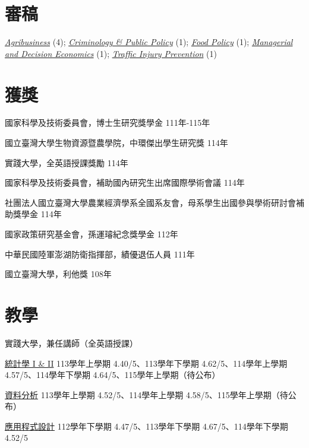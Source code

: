\documentclass[11pt,letterpaper]{article}
\begin{document}
\section{審稿}\label{ux5be9ux7a3f}

\href{https://onlinelibrary.wiley.com/journal/15206297}{\emph{Agribusiness}}
(4);
\href{https://onlinelibrary.wiley.com/journal/17459133}{\emph{Criminology
\& Public Policy}} (1);
\href{https://www.sciencedirect.com/journal/food-policy}{\emph{Food
Policy}} (1);
\href{https://onlinelibrary.wiley.com/journal/10991468}{\emph{Managerial
and Decision Economics}} (1);
\href{https://www.tandfonline.com/journals/gcpi20}{\emph{Traffic Injury
Prevention}} (1)

\section{獲獎}\label{ux7372ux734e}

國家科學及技術委員會，博士生研究獎學金 \hfill \mbox{111年-115年}

國立臺灣大學生物資源暨農學院，中環傑出學生研究獎 \hfill \mbox{114年}

實踐大學，全英語授課獎勵 \hfill \mbox{114年}

國家科學及技術委員會，補助國內研究生出席國際學術會議 \hfill \mbox{114年}

社團法人國立臺灣大學農業經濟學系全國系友會，母系學生出國參與學術研討會補助獎學金
\hfill \mbox{114年}

國家政策研究基金會，孫運璿紀念獎學金 \hfill \mbox{112年}

中華民國陸軍澎湖防衛指揮部，績優退伍人員 \hfill \mbox{111年}

國立臺灣大學，利他獎 \hfill \mbox{108年}

\section{教學}\label{ux6559ux5b78}

實踐大學，兼任講師（全英語授課）

\href{https://yyliou.github.io/stat}{統計學 I \& II}
\newline 113學年上學期 4.40/5、113學年下學期 4.62/5、114學年上學期
4.57/5、114學年下學期 4.64/5、115學年上學期（待公布）

\href{https://yyliou.github.io/da}{資料分析} \newline 113學年上學期
4.52/5、114學年上學期 4.58/5、115學年上學期（待公布）

\href{https://yyliou.github.io/pa}{應用程式設計} \newline 112學年下學期
4.47/5、113學年下學期 4.67/5、114學年下學期 4.52/5
\end{document}
